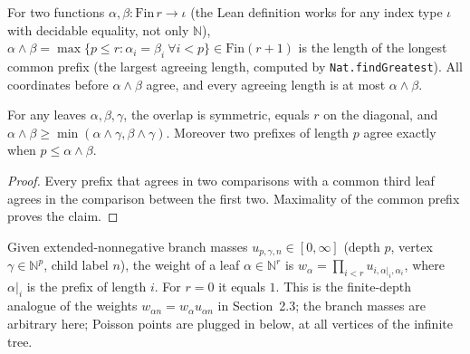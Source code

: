 \begin{definition}\label{def:sg:cascade-overlap}
  \leanok
For two functions $\alpha,\beta:\mathrm{Fin}\,r\to\iota$ (the Lean definition works for any index type $\iota$ with decidable equality, not only $\mathbb N$), $\alpha\wedge\beta=\max\{p\le r:\alpha_i=\beta_i\ \forall i<p\}\in\mathrm{Fin}(r+1)$ is the length of the longest common prefix (the largest agreeing length, computed by \texttt{Nat.findGreatest}). All coordinates before $\alpha\wedge\beta$ agree, and every agreeing length is at most $\alpha\wedge\beta$.
\end{definition}

\begin{lemma}\label{lem:sg:cascade-prefix}
  \leanok
For any leaves $\alpha,\beta,\gamma$, the overlap is symmetric, equals $r$
on the diagonal, and $\alpha\wedge\beta\ge
\min(\alpha\wedge\gamma,\beta\wedge\gamma)$.
Moreover two prefixes of length $p$ agree exactly when $p\le\alpha\wedge\beta$.
\end{lemma}
\begin{proof}
  \leanok
Every prefix that agrees in two comparisons with a common third leaf agrees in
the comparison between the first two. Maximality of the common prefix proves the claim.
\end{proof}

\begin{definition}\label{def:sg:cascade-weight}
  \leanok
Given extended-nonnegative branch masses $u_{p,\gamma,n}\in[0,\infty]$ (depth $p$, vertex $\gamma\in\mathbb N^p$, child label $n$), the weight of a leaf $\alpha\in\mathbb N^r$ is $w_\alpha=\prod_{i<r}u_{i,\alpha|_i,\alpha_i}$, where $\alpha|_i$ is the prefix of length $i$. For $r=0$ it equals $1$. This is the finite-depth analogue of the weights $w_{\alpha n}=w_\alpha u_{\alpha n}$ in Section~2.3; the branch masses are arbitrary here; Poisson points are plugged in below, at all vertices of the infinite tree.
\end{definition}

